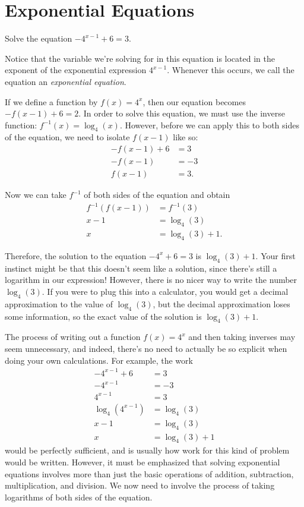 \documentclass[nooutcomes]{ximera}
\begin{document}
\section{Exponential Equations}
\begin{example}
Solve the equation $-4^{x -1} + 6 = 3$. 
\end{example}
\begin{explanation}
Notice that the variable we're solving for in this equation is located in the exponent of the exponential expression $4^{x - 1}$. Whenever this occurs, we call the equation an \emph{exponential equation}. 

If we define a function by $f(x) = 4^{x}$, then our equation becomes $-f(x - 1) + 6 = 2$. In order to solve this equation, we must use the inverse function: $f^{-1}(x) = \log_4(x)$. However, before we can apply this to both sides of the equation, we need to isolate $f(x - 1)$ like so:
\begin{align*}
-f(x - 1) + 6 & = 3 \\
-f(x - 1) &= -3 \\
f(x - 1) & = 3.
\end{align*}

Now we can take $f^{-1}$ of both sides of the equation and obtain
\begin{align*}
f^{-1}(f(x - 1)) &  = f^{-1}(3) \\
x - 1 & = \log_4(3) \\
x & = \log_4(3) + 1.
\end{align*}

Therefore, the solution to the equation $-4^x + 6 = 3$ is $\log_4(3) + 1$. Your first instinct might be that this doesn't seem like a solution, since there's still a logarithm in our expression! However, there is no nicer way to write the number $\log_4(3)$. If you were to plug this into a calculator, you would get a decimal approximation to the value of $\log_4(3)$, but the decimal approximation loses some information, so the exact value of the solution is $\log_4(3) + 1$. 

The process of writing out a function $f(x) = 4^x$ and then taking inverses may seem unnecessary, and indeed, there's no need to actually be so explicit when doing your own calculations. For example, the work
\begin{align*}
-4^{x - 1} + 6 & = 3 \\
-4^{x - 1} & = -3 \\
4^{x - 1} & = 3 \\
\log_4(4^{x - 1}) & = \log_4(3) \\
x - 1 & = \log_4(3) \\
x & = \log_4(3) + 1
\end{align*}
would be perfectly sufficient, and is usually how work for this kind of problem would be written. However, it must be emphasized that solving exponential equations involves more than just the basic operations of addition, subtraction, multiplication, and division. We now need to involve the process of taking logarithms of both sides of the equation. 

\end{explanation}
\end{document}
